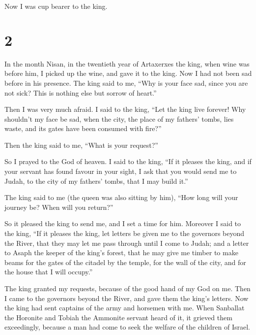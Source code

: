 Now I was cup bearer to the king.

\hypertarget{section-1}{%
\section{2}\label{section-1}}

 In the month Nisan, in the twentieth year of Artaxerxes the
king, when wine was before him, I picked up the wine, and gave it to the
king. Now I had not been sad before in his presence.  The
king said to me, ``Why is your face sad, since you are not sick? This is
nothing else but sorrow of heart.''

Then I was very much afraid.  I said to the king, ``Let the
king live forever! Why shouldn't my face be sad, when the city, the
place of my fathers' tombs, lies waste, and its gates have been consumed
with fire?''

 Then the king said to me, ``What is your request?''

So I prayed to the God of heaven.  I said to the king, ``If
it pleases the king, and if your servant has found favour in your sight,
I ask that you would send me to Judah, to the city of my fathers' tombs,
that I may build it.''

 The king said to me (the queen was also sitting by him),
``How long will your journey be? When will you return?''

So it pleased the king to send me, and I set a time for him.
 Moreover I said to the king, ``If it pleases the king, let
letters be given me to the governors beyond the River, that they may let
me pass through until I come to Judah;  and a letter to
Asaph the keeper of the king's forest, that he may give me timber to
make beams for the gates of the citadel by the temple, for the wall of
the city, and for the house that I will occupy.''

The king granted my requests, because of the good hand of my God on me.
 Then I came to the governors beyond the River, and gave
them the king's letters. Now the king had sent captains of the army and
horsemen with me.  When Sanballat the Horonite and Tobiah
the Ammonite servant heard of it, it grieved them exceedingly, because a
man had come to seek the welfare of the children of Israel.

